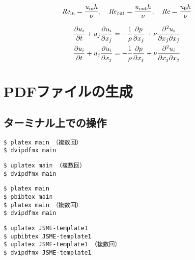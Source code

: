 \documentclass[
    paper=a4paper,      %
    report,             %
    fleqn,              %
    fontsize=12pt,      %
    jafontsize=12pt,    %
    head_space=33mm,    %
    foot_space=30mm,    %
    gutter=25mm,        %
    fore-edge=10mm      %
    ]{jlreq}            %
\begin{document}
\begin{equation}
    \mathit{Re}_{\mathrm{in}} = \frac{u_{\mathrm{in}} h}{\nu}, \quad \mathit{Re}_{\mathrm{out}} = \frac{u_{\mathrm{out}} h}{\nu}, \quad \mathit{Re} = \frac{u_0 h}{\nu}
\end{equation}

\begin{align}
    \frac{\partial u_i}{\partial t} + u_j\frac{\partial u_i}{\partial x_j} &= - \frac{1}{\rho}\frac{\partial p}{\partial x_j} + \nu\frac{\partial^2 u_i}{\partial x_j \partial x_j} \\
    \pdv{u_i}{t} + u_j\pdv{u_i}{x_j} &= - \frac{1}{\rho}\pdv{p}{x_j} + \nu\pdv{u_i}{x_j}{x_j}
\end{align}

\section{PDFファイルの生成}
\label{sec:makepdf}

\subsection{ターミナル上での操作}
\label{ssec:terminal}

\begin{tcolorbox}[enhanced, title=\pLaTeX, drop fuzzy shadow]
\begin{verbatim}
$ platex main （複数回）
$ dvipdfmx main
\end{verbatim}
\end{tcolorbox}


\begin{tcolorbox}[enhanced, title=\upLaTeX, drop fuzzy shadow]
\begin{verbatim}
$ uplatex main （複数回）
$ dvipdfmx main
\end{verbatim}
\end{tcolorbox}


\begin{tcolorbox}[enhanced, title=\pLaTeX$+$\pBibTeX, drop fuzzy shadow]
\begin{verbatim}
$ platex main
$ pbibtex main
$ platex main （複数回）
$ dvipdfmx main
\end{verbatim}
\end{tcolorbox}


\begin{tcolorbox}[enhanced, title=\upLaTeX$+$\upBibTeX, drop fuzzy shadow]
\begin{verbatim}
$ uplatex JSME-template1
$ upbibtex JSME-template1
$ uplatex JSME-template1 （複数回）
$ dvipdfmx JSME-template1
\end{verbatim}
\end{tcolorbox}
\end{document}
